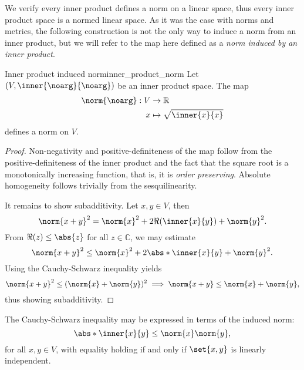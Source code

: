 We verify every inner product defines a norm on a linear space, thus every inner product space is a normed linear space. As it was the case with norms and metrics, the following construction is not the only way to induce a norm from an inner product, but we will refer to the map here defined as a \emph{norm induced by an inner product}.
\begin{proposition}{Inner product induced norm}{inner_product_norm}
    Let \((V, \inner{\noarg}{\noarg})\) be an inner product space. The map
    \begin{align*}
        \norm{\noarg} : V &\to \mathbb{R}\\
                        x &\mapsto \sqrt{\inner{x}{x}}
    \end{align*}
    defines a norm on \(V\).
\end{proposition}
\begin{proof}
    Non-negativity and positive-definiteness of the map follow from the positive-definiteness of the inner product and the fact that the square root is a monotonically increasing function, that is, it is \emph{order preserving}. Absolute homogeneity follows trivially from the sesquilinearity.

    It remains to show subadditivity. Let \(x,y \in V\), then
    \begin{equation*}
        \norm{x + y}^2 = \norm{x}^2 + 2\Re(\inner{x}{y}) + \norm{y}^2.
    \end{equation*}
    From \(\Re(z) \leq \abs{z}\) for all \(z \in \mathbb{C}\), we may estimate
    \begin{equation*}
        \norm{x + y}^2 \leq \norm{x}^2 + 2\abs*{\inner{x}{y}} + \norm{y}^2.
    \end{equation*}
    Using the Cauchy-Schwarz inequality yields
    \begin{equation*}
        \norm{x+y}^2 \leq (\norm{x} + \norm{y})^2 \implies \norm{x+y} \leq \norm{x} + \norm{y},
    \end{equation*}
    thus showing subadditivity.
\end{proof}
\begin{remark}
    The Cauchy-Schwarz inequality may be expressed in terms of the induced norm:
    \begin{equation*}
        \abs*{\inner{x}{y}} \leq \norm{x} \norm{y},
    \end{equation*}
    for all \(x, y \in V\), with equality holding if and only if \(\set{x,y}\) is linearly independent.
\end{remark}


